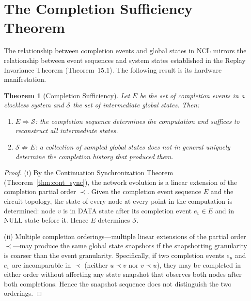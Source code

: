 \documentclass[12pt, oneside]{book}
\theoremstyle{flyxion}
\newtheorem{theorem}{Theorem}[chapter]
\theoremstyle{definition}
\begin{document}
\section{The Completion Sufficiency Theorem}

The relationship between completion events and global
states in NCL mirrors the relationship between event
sequences and system states established in the Replay
Invariance Theorem (Theorem~15.1). The following
result is its hardware manifestation.

\begin{theorem}[Completion Sufficiency]
\label{thm:completion_sufficiency}
Let $E$ be the set of completion events in a clockless
system and $\mathcal{S}$ the set of intermediate global
states. Then:
\begin{enumerate}
\item[(i)] $E \Rightarrow \mathcal{S}$: the completion
   sequence determines the computation and suffices to
   reconstruct all intermediate states.
\item[(ii)] $\mathcal{S} \not\Rightarrow E$: a
   collection of sampled global states does not in
   general uniquely determine the completion history
   that produced them.
\end{enumerate}
\end{theorem}

\begin{proof}
(i) By the Continuation Synchronization Theorem
(Theorem~\ref{thm:cont_sync}), the network evolution
is a linear extension of the completion partial order
$\prec$. Given the completion event sequence $E$ and
the circuit topology, the state of every node at every
point in the computation is determined: node $v$ is in
DATA state after its completion event $e_v \in E$ and
in NULL state before it. Hence $E$ determines
$\mathcal{S}$.

(ii) Multiple completion orderings---multiple linear
extensions of the partial order $\prec$---may produce
the same global state snapshots if the snapshotting
granularity is coarser than the event granularity.
Specifically, if two completion events $e_u$ and $e_v$
are incomparable in $\prec$ (neither $u \prec v$ nor
$v \prec u$), they may be completed in either order
without affecting any state snapshot that observes
both nodes after both completions. Hence the snapshot
sequence does not distinguish the two orderings.
\end{proof}
\end{document}
